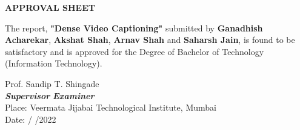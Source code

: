 \begin{center}
    {\textbf{APPROVAL SHEET}}\\ \vspace{1cm}
\end{center}
The report, \textbf{"Dense Video Captioning" }submitted by \textbf{Ganadhish Acharekar}, \textbf{Akshat Shah}, \textbf{Arnav Shah} and \textbf{Saharsh Jain}, is found to be satisfactory and is approved for the Degree of Bachelor of Technology (Information Technology).

\vspace{2cm}
Prof. Sandip T. Shingade
\hfill
 \\
\indent \textit{\textbf{Supervisor}}
\hfill
\textit{\textbf{Examiner}} \\


\vspace{2cm}
Place: Veermata Jijabai Technological Institute, Mumbai\\
\indent Date:               /              /2022
 \par